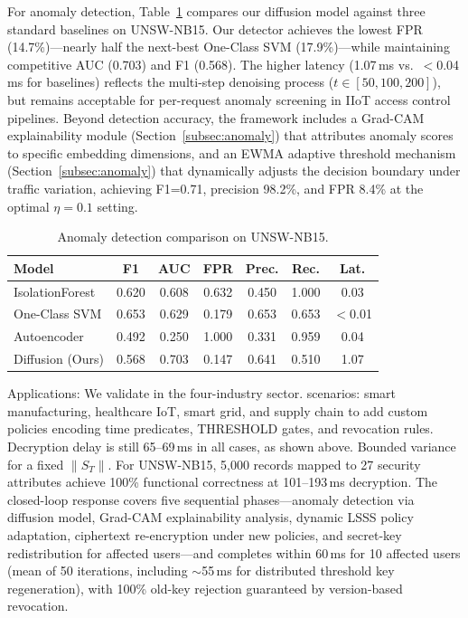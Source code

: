 \documentclass[lettersize,journal]{IEEEtran}
\begin{document}
For anomaly detection, Table~\ref{tab:baseline_comparison} compares
our diffusion model against three standard baselines on UNSW-NB15.
Our detector achieves the lowest FPR (14.7\%)---nearly half the
next-best One-Class SVM (17.9\%)---while maintaining competitive AUC
(0.703) and F1 (0.568). The higher latency (1.07\,ms vs.\ $<$0.04\,ms
for baselines) reflects the multi-step denoising process
($t\in[50,100,200]$), but remains acceptable for per-request
anomaly screening in IIoT access control pipelines.
Beyond detection accuracy, the framework includes a Grad-CAM
explainability module (Section~\ref{subsec:anomaly}) that attributes
anomaly scores to specific embedding dimensions, and an EWMA adaptive
threshold mechanism (Section~\ref{subsec:anomaly}) that dynamically
adjusts the decision boundary under traffic variation, achieving F1=0.71,
precision 98.2\%, and FPR 8.4\% at the optimal $\eta=0.1$ setting.

\begin{table}[!t]
\renewcommand{\arraystretch}{1.0}
\setlength{\tabcolsep}{1.5pt}
\caption{Anomaly detection comparison on UNSW-NB15.}
\label{tab:baseline_comparison}
\centering
\scriptsize
\begin{tabular}{lcccccc}
\toprule
\textbf{Model} & \textbf{F1} & \textbf{AUC} & \textbf{FPR} & \textbf{Prec.} & \textbf{Rec.} & \textbf{Lat.} \\
\midrule
IsolationForest & 0.620 & 0.608 & 0.632 & 0.450 & 1.000 & 0.03 \\
One-Class SVM & 0.653 & 0.629 & 0.179 & 0.653 & 0.653 & $<$0.01 \\
Autoencoder & 0.492 & 0.250 & 1.000 & 0.331 & 0.959 & 0.04 \\
Diffusion (Ours) & 0.568 & 0.703 & 0.147 & 0.641 & 0.510 & 1.07 \\
\bottomrule
\end{tabular}
\end{table}

Applications:
We validate in the four-industry sector.
scenarios: smart manufacturing, healthcare IoT, smart grid,
and supply chain to add custom policies encoding time predicates,
THRESHOLD gates, and revocation rules. Decryption delay is still
65--69\,ms in all cases, as shown above.
Bounded variance for a fixed $\|S_T\|$. For UNSW-NB15, 5,000 records
mapped to 27 security attributes achieve 100\% functional correctness at
101--193\,ms decryption. The closed-loop response covers five sequential
phases---anomaly detection via diffusion model, Grad-CAM explainability
analysis, dynamic LSSS policy adaptation, ciphertext re-encryption under
new policies, and secret-key redistribution for affected users---and
completes within $60$\,ms for 10 affected users (mean of 50
iterations, including $\sim$55\,ms for distributed threshold key
regeneration), with 100\% old-key rejection guaranteed by version-based
revocation.
\end{document}
